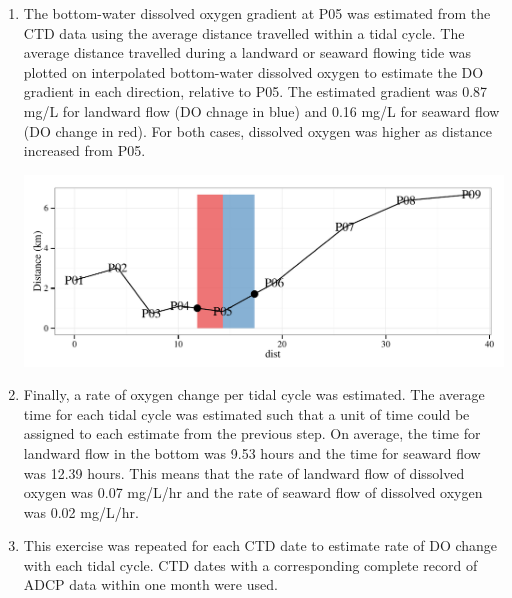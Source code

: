 \documentclass[letterpaper,12pt]{article}\usepackage[]{graphicx}\usepackage[]{color}
\makeatletter
\def\maxwidth{ %
  \ifdim\Gin@nat@width>\linewidth
    \linewidth
  \else
    \Gin@nat@width
  \fi
}
\makeatother
\begin{document}
\begin{enumerate}
{{}



}
\item{

The bottom-water dissolved oxygen gradient at P05 was estimated from the CTD data using the average distance travelled within a tidal cycle.  The average distance travelled during a landward or seaward flowing tide was plotted on interpolated bottom-water dissolved oxygen to estimate the DO gradient in each direction, relative to P05.  The estimated gradient was 0.87 mg/L for landward flow (DO chnage in blue) and 0.16 mg/L for seaward flow (DO change in red).  For both cases, dissolved oxygen was higher as distance increased from P05.  


{\centering \includegraphics[width=\maxwidth]{figs/unnamed-chunk-5-1} 

}



}
\item{

Finally, a rate of oxygen change per tidal cycle was estimated.  The average time for each tidal cycle was estimated such that a unit of time could be assigned to each estimate from the previous step.  On average, the time for landward flow in the bottom was 9.53 hours and the time for seaward flow was 12.39 hours. This means that the rate of landward flow of dissolved oxygen was 0.07 mg/L/hr and the rate of seaward flow of dissolved oxygen was 0.02 mg/L/hr.
}
\item{
This exercise was repeated for each CTD date to estimate rate of DO change with each tidal cycle.  CTD dates with a corresponding complete record of ADCP data within one month were used.


}
\end{enumerate}
\end{document}
